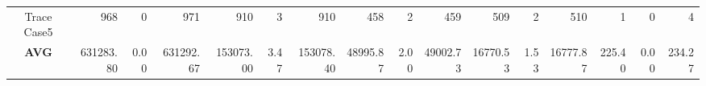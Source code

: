 \begin{table*}[t]
{\begin{tabular}{c|rrr|rrr|rrr|rrr|rrr}
Trace Case5          & 968                                         & 0                                           & 971                                       & 910                                         & 3                                           & 910                                       & 458                                         & 2                                           & 459                                       & 509                                         & 2                                           & 510                                       & 1                                           & 0                                           & 4                                        \\
\textbf{AVG}         & 631283.80                                   & 0.00                                        & 631292.67                                 & 153073.00                                   & 3.47                                        & 153078.40                                 & 48995.87                                    & 2.00                                        & 49002.73                                  & 16770.53                                    & 1.53                                        & 16777.87                                  & 225.40                                      & 0.00                                        & 234.27                                   \\ \hline
\end{tabular}
}
\end{table*}


